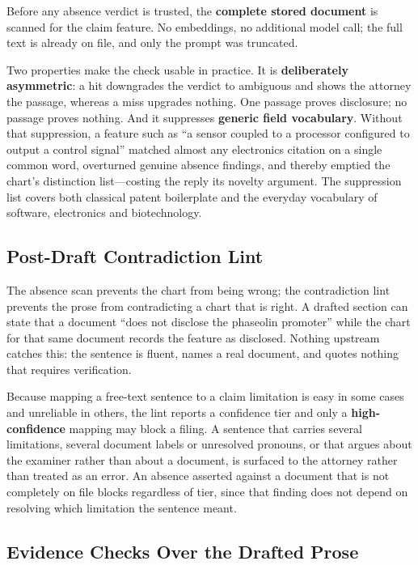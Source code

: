 \documentclass[conference]{IEEEtran}
\begin{document}
Before any absence verdict is trusted, the \textbf{complete stored document} is scanned for the claim feature. No embeddings, no additional model call; the full text is already on file, and only the prompt was truncated.

Two properties make the check usable in practice. It is \textbf{deliberately asymmetric}: a hit downgrades the verdict to ambiguous and shows the attorney the passage, whereas a miss upgrades nothing. One passage proves disclosure; no passage proves nothing. And it suppresses \textbf{generic field vocabulary}. Without that suppression, a feature such as ``a sensor coupled to a processor configured to output a control signal'' matched almost any electronics citation on a single common word, overturned genuine absence findings, and thereby emptied the chart's distinction list---costing the reply its novelty argument. The suppression list covers both classical patent boilerplate and the everyday vocabulary of software, electronics and biotechnology.

\subsection{Post-Draft Contradiction Lint}

The absence scan prevents the chart from being wrong; the contradiction lint prevents the prose from contradicting a chart that is right. A drafted section can state that a document ``does not disclose the phaseolin promoter'' while the chart for that same document records the feature as disclosed. Nothing upstream catches this: the sentence is fluent, names a real document, and quotes nothing that requires verification.

Because mapping a free-text sentence to a claim limitation is easy in some cases and unreliable in others, the lint reports a confidence tier and only a \textbf{high-confidence} mapping may block a filing. A sentence that carries several limitations, several document labels or unresolved pronouns, or that argues about the examiner rather than about a document, is surfaced to the attorney rather than treated as an error. An absence asserted against a document that is not completely on file blocks regardless of tier, since that finding does not depend on resolving which limitation the sentence meant.

\subsection{Evidence Checks Over the Drafted Prose}
\end{document}
